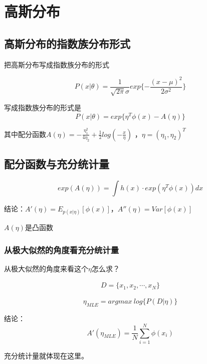 \chapter{高斯分布}

\section{高斯分布的指数族分布形式}

把高斯分布写成指数族分布的形式

\begin{equation}
    P(x|\theta)=\frac{1}{\sqrt{2\pi}\sigma}exp\{-\frac{(x-\mu)^2}{2\sigma^2}\}
\end{equation}

写成指数族分布的形式是
\begin{equation}
    P(x|\theta)=exp\{\eta^T\phi(x)-A(\eta)\}
\end{equation}

其中配分函数$A(\eta)=-\frac{\eta_1^2}{4\eta_2}+\frac{1}{2}log(-\frac{x}{\eta})$
，$\eta=(\eta_1,\eta_2)^T$

\section{配分函数与充分统计量}

\begin{equation}
    exp(A(\eta))=\int h(x)\cdot exp(\eta^T\phi(x))dx
\end{equation}

结论：$A'(\eta)=E_{p(x|\eta)}[\phi(x)]$，$A''(\eta)=Var[\phi(x)]$

$A(\eta)$是凸函数

\subsection*{从极大似然的角度看充分统计量}

从极大似然的角度来看这个$\eta$怎么求？

\begin{eqnarray}
    D=\{x_{1},x_2,\cdots,x_N\}
\end{eqnarray}

\begin{equation}
    \eta_{MLE}=argmax\ log\{ P(D|\eta)\}
\end{equation}

结论：
\begin{equation}
    A'(\eta_{MLE})=\frac{1}{N}\sum_{i=1}^{N}\phi(x_i)
\end{equation}

充分统计量就体现在这里。

